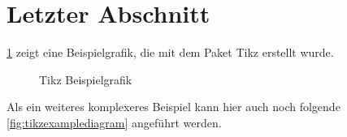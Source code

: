 \lipsum[2-4]

\clearpage

\section{Letzter Abschnitt}\label{sec:last}

\cref{fig:tikzexamplegraphics} zeigt eine Beispielgrafik, die mit dem Paket \glqq Tikz\grqq{} erstellt wurde.

\begin{figure}[!ht]
    \centering
    \caption{Tikz Beispielgrafik}
    \label{fig:tikzexamplegraphics}
\end{figure}

\noindent Als ein weiteres komplexeres Beispiel kann hier auch noch folgende \cref{fig:tikzexamplediagram} angeführt werden.

